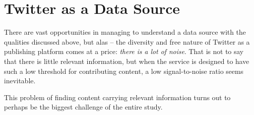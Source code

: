 
\section{Twitter as a Data Source} %
\label{sec:twitter_as_a_data_source}

There are vast opportunities in managing to understand a data source with the qualities discussed above, but alas -- the diversity and free nature of Twitter as a publishing platform comes at a price: \emph{there is a lot of noise}.
That is not to say that there is little relevant information, but when the service is designed to have such a low threshold for contributing content, a low signal-to-noise ratio seems inevitable.

This problem of finding content carrying relevant information turns out to perhaps be the biggest challenge of the entire study.


